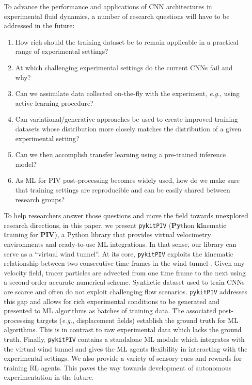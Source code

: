 \documentclass[a4paper,fleqn]{cas-dc}
\begin{document}
To advance the performance and applications of CNN architectures in experimental fluid dynamics, a number of research questions will have to be addressed in the future:
\begin{enumerate}
\item How rich should the training dataset be to remain applicable in a practical range of experimental settings?
\item At which challenging experimental settings do the current CNNs fail and why?
\item Can we assimilate data collected on-the-fly with the experiment, \textit{e.g.}, using active learning procedure?
\item Can variational/generative approaches be used to create improved training datasets whose distribution more closely matches the distribution of a given experimental setting?
\item Can we then accomplish transfer learning using a pre-trained inference model?
\item As ML for PIV post-processing becomes widely used, how do we make sure that training settings are reproducible and can be easily shared between research groups?
\end{enumerate}

To help researchers answer those questions and move the field towards unexplored research directions, in this paper, we present \texttt{pykitPIV} (\textbf{Py}thon \textbf{ki}nematic \textbf{t}raining for \textbf{PIV}), a Python library that provides virtual velocimetry environments and ready-to-use ML integrations. In that sense, our library can serve as a ``virtual wind tunnel''. At its core, \texttt{pykitPIV} exploits the kinematic relationship between two consecutive time frames in the wind tunnel \cite{manickathan2022kinematic}. Given any velocity field, tracer particles are advected from one time frame to the next using a second-order accurate numerical scheme. Synthetic dataset used to train CNNs are scarce and often do not exploit challenging flow scenarios. \texttt{pykitPIV} addresses this gap and allows for rich experimental conditions to be generated and presented to ML algorithms as batches of training data. The associated post-processing targets (\textit{e.g.}, displacement fields) establish the ground truth for ML algorithms. This is in contrast to raw experimental data which lacks the ground truth. Finally, \texttt{pykitPIV} contains a standalone ML module which integrates with the virtual wind tunnel and gives the ML agents flexibility in interacting with the experimental settings. We also provide a variety of sensory cues and rewards for training RL agents. This paves the way towards development of autonomous experimentation in the future.
\end{document}
